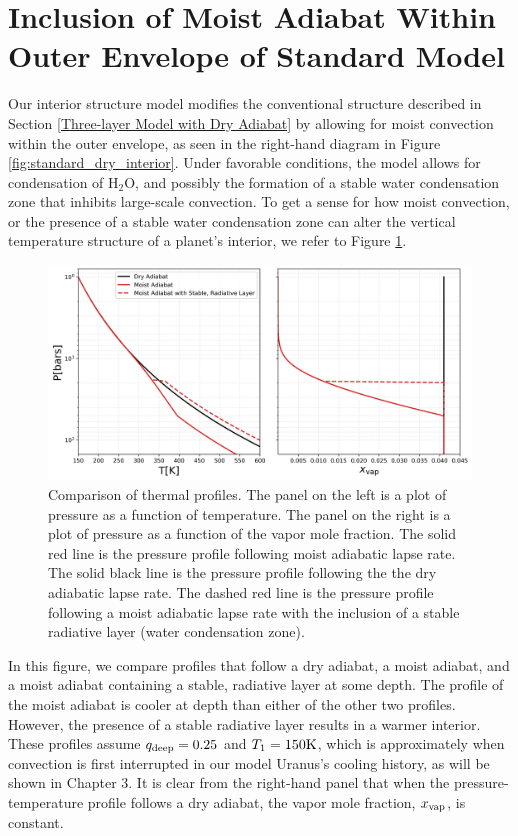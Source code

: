 \documentclass[11pt]{ucscthesisbs}
\begin{document}
\section{Inclusion of Moist Adiabat Within Outer Envelope of Standard Model}
Our interior structure model modifies the conventional structure described in Section \ref{Three-layer Model with Dry Adiabat} by allowing for moist convection within the outer envelope, as seen in the right-hand diagram in Figure \ref{fig:standard_dry_interior}. Under favorable conditions, the model allows for condensation of H$_{2}$O, and possibly the formation of a stable water condensation zone that inhibits large-scale convection. To get a sense for how moist convection, or the presence of a stable water condensation zone can alter the vertical temperature structure of a planet's interior, we refer to Figure \ref{fig:comparison_adiabatic_profiles}. 
\begin{figure}[h]
 \centerline{
  \includegraphics[width=\columnwidth]{figures/comparison_dry_vs_moist_lapse_rates.png}
 }
\caption[A Standard Interior Structure Model]
{Comparison of thermal profiles. The panel on the left is a plot of pressure as a function of temperature. The panel on the right is a plot of pressure as a function of the vapor mole fraction. The solid red line is the pressure profile following moist adiabatic lapse rate. The solid black line is the pressure profile following the the dry adiabatic lapse rate. The dashed red line is the pressure profile following a moist adiabatic lapse rate with the inclusion of a stable radiative layer (water condensation zone).} 
\label{fig:comparison_adiabatic_profiles}
\end{figure}
In this figure, we compare profiles that follow a dry adiabat, a moist adiabat, and a moist adiabat containing a stable, radiative layer at some depth. The profile of the moist adiabat is cooler at depth than either of the other two profiles. However, the presence of a stable radiative layer results in a warmer interior. These profiles assume $q_{\rm deep} = 0.25$ and $T_{1} = 150\rm K$, which is approximately when convection is first interrupted in our model Uranus's cooling history, as will be shown in Chapter 3. It is clear from the right-hand panel that when the pressure-temperature profile follows a dry adiabat, the vapor mole fraction, $x_{\rm vap}$, is constant.
\end{document}
